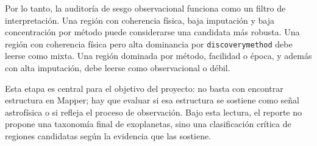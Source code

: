Por lo tanto, la auditoría de sesgo observacional funciona como un filtro de interpretación. Una región con coherencia física, baja imputación y baja concentración por método puede considerarse una candidata más robusta. Una región con coherencia física pero alta dominancia por \texttt{discoverymethod} debe leerse como mixta. Una región dominada por método, facilidad o época, y además con alta imputación, debe leerse como observacional o débil.

Esta etapa es central para el objetivo del proyecto: no basta con encontrar estructura en Mapper; hay que evaluar si esa estructura se sostiene como señal astrofísica o si refleja el proceso de observación. Bajo esta lectura, el reporte no propone una taxonomía final de exoplanetas, sino una clasificación crítica de regiones candidatas según la evidencia que las sostiene.